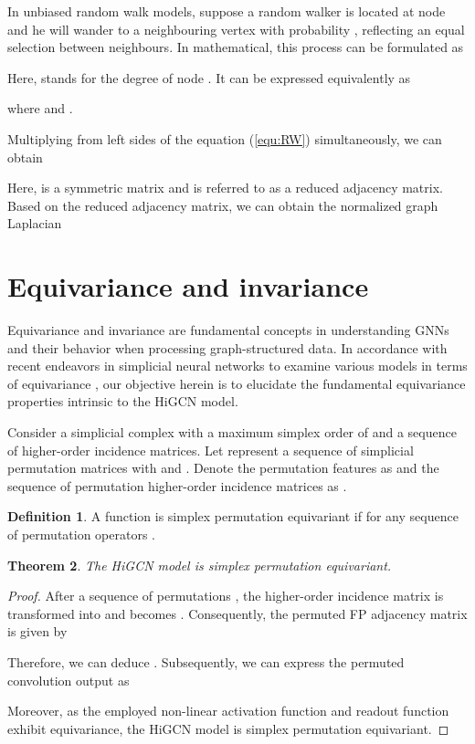 \documentclass[letterpaper]{article} \usepackage{aaai24}
\theoremstyle{plain}
\newtheorem{theorem}{Theorem}[section]
\theoremstyle{definition}
\newtheorem{definition}[theorem]{Definition}
\theoremstyle{remark}
\begin{document}
In unbiased random walk models, suppose a random walker is located at node  and he will wander to a neighbouring vertex  with probability , reflecting an equal selection between  neighbours. In mathematical, this process can be formulated as

Here,  stands for the degree of node .
It can be expressed equivalently as

where  and .

Multiplying  from left sides of the equation (\ref{equ:RW}) simultaneously, we can obtain

Here,  is a symmetric matrix and is referred to as a reduced adjacency matrix. Based on the reduced adjacency matrix, we can obtain the normalized graph Laplacian





\section{Equivariance and invariance}
\label{appendix:symmetry}

Equivariance and invariance are fundamental concepts in understanding GNNs and their behavior when processing graph-structured data.
In accordance with recent endeavors in simplicial neural networks to examine various models in terms of equivariance \cite{SWL2021, Qu2020QIP, SCNN2022}, our objective herein is to elucidate the fundamental equivariance properties intrinsic to the HiGCN model.


Consider a simplicial complex  with a maximum simplex order of  and a sequence  of higher-order incidence matrices. 
Let  represent a sequence of simplicial permutation matrices with  and . 
Denote the permutation features as  and the sequence of permutation higher-order incidence matrices  as .



\begin{definition}
A function  is simplex permutation equivariant if  for any sequence of permutation operators .
\end{definition}


\begin{theorem}
\label{the:equivariance}
The HiGCN model is simplex permutation equivariant.
\end{theorem}

\begin{proof}After a sequence of permutations , the higher-order incidence matrix  is transformed into  and   becomes . Consequently,  the permuted FP adjacency matrix  is given by 


Therefore, we can deduce . Subsequently, we can express the permuted convolution output as


Moreover, as the employed non-linear activation function and readout function exhibit equivariance, the HiGCN model is simplex permutation equivariant.
\end{proof}
\end{document}
